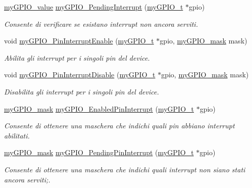\begin{DoxyCompactItemize}
\hyperlink{group__bare-metal_gaf634fe4a0e1eab8da5000b72d6ad362b}{my\+G\+P\+I\+O\+\_\+value} \hyperlink{group__bare-metal_ga386cea84aca8c6bb731b4b46fcbf9199}{my\+G\+P\+I\+O\+\_\+\+Pending\+Interrupt} (\hyperlink{structmy_g_p_i_o__t}{my\+G\+P\+I\+O\+\_\+t} $\ast$gpio)
\begin{DoxyCompactList}\small\item\em Consente di verificare se esistano interrupt non ancora serviti. \end{DoxyCompactList}\item 
void \hyperlink{group__bare-metal_ga116e3a1077a317e9e42ded6dd4df64af}{my\+G\+P\+I\+O\+\_\+\+Pin\+Interrupt\+Enable} (\hyperlink{structmy_g_p_i_o__t}{my\+G\+P\+I\+O\+\_\+t} $\ast$gpio, \hyperlink{group__bare-metal_ga402a0d20afc0cb7c25554b8b023f4253}{my\+G\+P\+I\+O\+\_\+mask} mask)
\begin{DoxyCompactList}\small\item\em Abilita gli interrupt per i singoli pin del device. \end{DoxyCompactList}\item 
void \hyperlink{group__bare-metal_ga37d3df33ac50387d6f2e1fb5e2b13e49}{my\+G\+P\+I\+O\+\_\+\+Pin\+Interrupt\+Disable} (\hyperlink{structmy_g_p_i_o__t}{my\+G\+P\+I\+O\+\_\+t} $\ast$gpio, \hyperlink{group__bare-metal_ga402a0d20afc0cb7c25554b8b023f4253}{my\+G\+P\+I\+O\+\_\+mask} mask)
\begin{DoxyCompactList}\small\item\em Disabilita gli interrupt per i singoli pin del device. \end{DoxyCompactList}\item 
\hyperlink{group__bare-metal_ga402a0d20afc0cb7c25554b8b023f4253}{my\+G\+P\+I\+O\+\_\+mask} \hyperlink{group__bare-metal_ga80ef1cf3e9bd8bfd4d849a0f3b8e7b2c}{my\+G\+P\+I\+O\+\_\+\+Enabled\+Pin\+Interrupt} (\hyperlink{structmy_g_p_i_o__t}{my\+G\+P\+I\+O\+\_\+t} $\ast$gpio)
\begin{DoxyCompactList}\small\item\em Consente di ottenere una maschera che indichi quali pin abbiano interrupt abilitati. \end{DoxyCompactList}\item 
\hyperlink{group__bare-metal_ga402a0d20afc0cb7c25554b8b023f4253}{my\+G\+P\+I\+O\+\_\+mask} \hyperlink{group__bare-metal_ga6115bde39f860d4e76e7d8f421ce222c}{my\+G\+P\+I\+O\+\_\+\+Pending\+Pin\+Interrupt} (\hyperlink{structmy_g_p_i_o__t}{my\+G\+P\+I\+O\+\_\+t} $\ast$gpio)
\begin{DoxyCompactList}\small\item\em Consente di ottenere una maschera che indichi quali interrupt non siano stati ancora serviti;. \end{DoxyCompactList}\item 

\end{DoxyCompactItemize}
